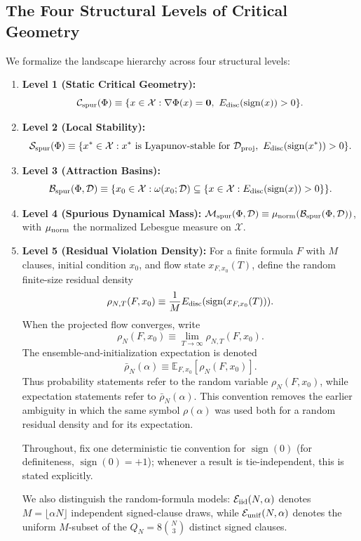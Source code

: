 \documentclass[11pt,a4paper]{article}
\begin{document}
\subsection{The Four Structural Levels of Critical Geometry}
We formalize the landscape hierarchy across four structural levels:
\begin{enumerate}
    \item \textbf{Level 1 (Static Critical Geometry):}
    \[
    \mathcal{C}_{\rm spur}(\Phi)
    \equiv \{x\in\mathcal X:\nabla\Phi(x)=\mathbf0,\ E_{\rm disc}(\operatorname{sign}(x))>0\}.
    \]
    \item \textbf{Level 2 (Local Stability):}
    \[
    \mathcal{S}_{\rm spur}(\Phi)
    \equiv \{x^*\in\mathcal X:x^*\text{ is Lyapunov-stable for }\mathcal D_{\rm proj},\ E_{\rm disc}(\operatorname{sign}(x^*))>0\}.
    \]
    \item \textbf{Level 3 (Attraction Basins):}
    \[
    \mathcal{B}_{\rm spur}(\Phi,\mathcal D)
    \equiv \{x_0\in\mathcal X:\omega(x_0;\mathcal D)\subseteq
    \{x\in\mathcal X:E_{\rm disc}(\operatorname{sign}(x))>0\}\}.
    \]
    \item \textbf{Level 4 (Spurious Dynamical Mass):} $\mathcal{M}_{\rm spur}(\Phi, \mathcal{D}) \equiv \mu_{\rm norm}(\mathcal{B}_{\rm spur}(\Phi, \mathcal{D}))$, with $\mu_{\rm norm}$ the normalized Lebesgue measure on $\mathcal{X}$.
    \item \textbf{Level 5 (Residual Violation Density):} For a finite formula $F$ with $M$ clauses, initial condition $x_0$, and flow state $x_{F,x_0}(T)$, define the random finite-size residual density
    \[
    \rho_{N,T}(F,x_0)\equiv \frac{1}{M}E_{\rm disc}(\operatorname{sign}(x_{F,x_0}(T))).
    \]
    When the projected flow converges, write
    \[
    \rho_N(F,x_0)\equiv \lim_{T\to\infty}\rho_{N,T}(F,x_0).
    \]
    The ensemble-and-initialization expectation is denoted
    \[
    \bar\rho_N(\alpha)\equiv \mathbb E_{F,x_0}[\rho_N(F,x_0)].
    \]
    Thus probability statements refer to the random variable $\rho_N(F,x_0)$, while expectation statements refer to $\bar\rho_N(\alpha)$. This convention removes the earlier ambiguity in which the same symbol $\rho(\alpha)$ was used both for a random residual density and for its expectation.

    Throughout, fix one deterministic tie convention for $\operatorname{sign}(0)$ (for definiteness, $\operatorname{sign}(0)=+1$); whenever a result is tie-independent, this is stated explicitly.

    We also distinguish the random-formula models:
    $\mathcal E_{\rm iid}(N,\alpha)$ denotes $M=\lfloor\alpha N\rfloor$ independent signed-clause draws, while
    $\mathcal E_{\rm unif}(N,\alpha)$ denotes the uniform $M$-subset of the $Q_N=8\binom N3$ distinct signed clauses.
\end{enumerate}
\end{document}
